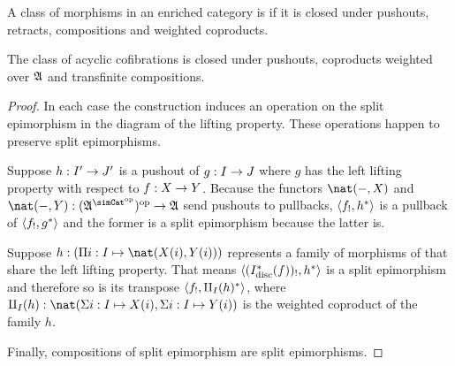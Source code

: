 \documentclass[csh.tex]{subfiles}
\begin{document}
\begin{definition} A class of morphisms in an enriched category is  if it is closed under pushouts, retracts, compositions and weighted coproducts. \end{definition}

\begin{lemma} The class of acyclic cofibrations is closed under pushouts, coproducts weighted over $\mathfrak A$ and transfinite compositions. \label{saturation}\end{lemma}

\begin{proof}
In each case the construction induces an operation on the split epimorphism in the diagram of the lifting property. These operations happen to preserve split epimorphisms.

Suppose $h: I'\to J'$ is a pushout of $g: I\to J$ where $g$ has the left lifting property with respect to $f: X\to Y$. Because the functors $\nat(-,X)$ and $\nat(-,Y)\of(\ambient\s)\dual\to\ambient$ send pushouts to pullbacks, $\left\langle f_!,h^* \right\rangle$ is a pullback of $\left\langle f_!,g^* \right\rangle$ and the former is a split epimorphism because the latter is.

Suppose $h\of(\product{i\of I}{\nat(X(i),Y(i))})$ represents a family of morphisms of that share the left lifting property. That means $\left\langle (I_{\rm disc}^*(f))_!,h^* \right\rangle$ is a split epimorphism and therefore so is its transpose $\left\langle f_!,\amalg_I(h)^* \right\rangle$, where $\amalg_I(h)\of\nat(\coproduct{i\of I}{X(i)},\coproduct{i\of I}{Y(i)})$ is the weighted coproduct of the family $h$.%

Finally, compositions of split epimorphism are split epimorphisms.
\end{proof}
\end{document}
